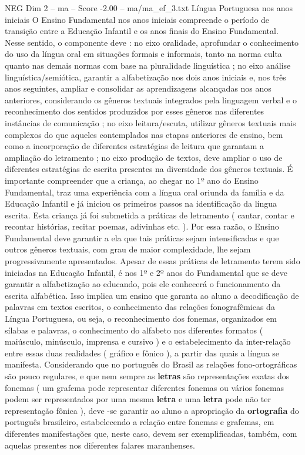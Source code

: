 \begin{textsample}{NEG Dim 2 – ma – Score -2.00 – ma/ma\_ef\_3.txt}  \label{ex:f2_neg_231}
Língua Portuguesa nos anos iniciais O Ensino Fundamental nos anos iniciais compreende o período de transição entre a Educação Infantil e os anos finais do Ensino Fundamental.
Nesse sentido, o componente deve : no eixo oralidade, aprofundar o conhecimento do uso da língua oral em situações formais e informais, tanto na norma culta quanto nas demais normas com base na pluralidade linguística ; no eixo análise linguística/semiótica, garantir a alfabetização nos dois anos iniciais e, nos três anos seguintes, ampliar e consolidar as aprendizagens alcançadas nos anos anteriores, considerando os gêneros textuais integrados pela linguagem verbal e o reconhecimento dos sentidos produzidos por esses gêneros nas diferentes instâncias de comunicação ; no eixo leitura/escuta, utilizar gêneros textuais mais complexos do que aqueles contemplados nas etapas anteriores de ensino, bem como a incorporação de diferentes estratégias de leitura que garantam a ampliação do letramento ; no eixo produção de textos, deve ampliar o uso de diferentes estratégias de escrita presentes na diversidade dos gêneros textuais.
É importante compreender que a criança, ao chegar no 1º ano do Ensino Fundamental, traz uma experiência com a língua oral oriunda da família e da Educação Infantil e já iniciou os primeiros passos na identificação da língua escrita.
Esta criança já foi submetida a práticas de letramento ( cantar, contar e recontar histórias, recitar poemas, adivinhas etc. ).
Por essa razão, o Ensino Fundamental deve garantir a ela que tais práticas sejam intensificadas e que outros gêneros textuais, com grau de maior complexidade, lhe sejam progressivamente apresentados.
Apesar de essas práticas de letramento terem sido iniciadas na Educação Infantil, é nos 1º e 2º anos do Fundamental que se deve garantir a alfabetização ao educando, pois ele conhecerá o funcionamento da escrita alfabética.
Isso implica um ensino que garanta ao aluno a decodificação de palavras em textos escritos, o conhecimento das relações fonografêmicas da Língua Portuguesa, ou seja, o reconhecimento dos fonemas, organizados em sílabas e palavras, o conhecimento do alfabeto nos diferentes formatos ( maiúsculo, minúsculo, imprensa e cursivo ) e o estabelecimento da inter-relação entre essas duas realidades ( gráfico e fônico ), a partir das quais a língua se manifesta.
Considerando que no português do Brasil as relações fono-ortográficas são pouco regulares, e que nem sempre as \textbf{letras} são representações exatas dos fonemas ( um grafema pode representar diferentes fonemas ou vários fonemas podem ser representados por uma mesma \textbf{letra} e uma \textbf{letra} pode não ter representação fônica ), deve -se garantir ao aluno a apropriação da \textbf{ortografia} do português brasileiro, estabelecendo a relação entre fonemas e grafemas, em diferentes manifestações que, neste caso, devem ser exemplificadas, também, com aquelas presentes nos diferentes falares maranhenses.

\end{textsample}
